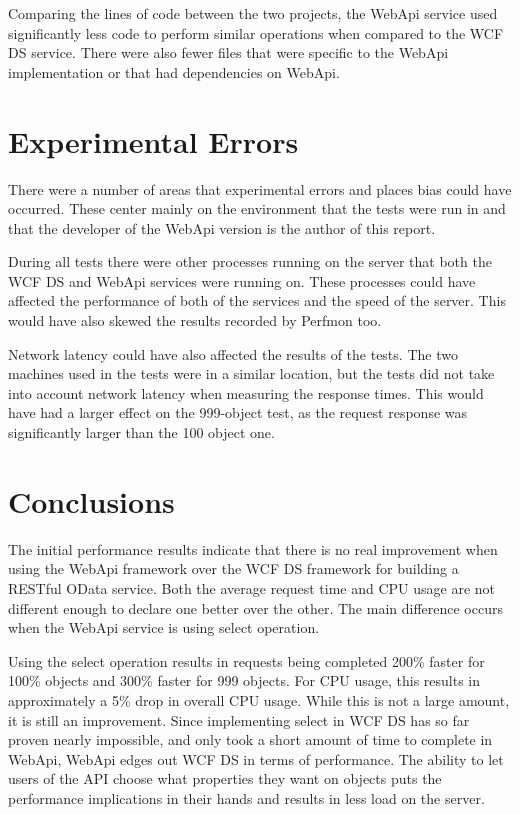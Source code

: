 \documentclass[se]{uw-wkrpt}
\begin{document}
Comparing the lines of code between the two projects, the WebApi service used significantly less code to perform similar operations when compared to the WCF DS service. There were also fewer files that were specific to the WebApi implementation or that had dependencies on WebApi.

\section{Experimental Errors}

There were a number of areas that experimental errors and places bias could have occurred. These center mainly on the environment that the tests were run in and that the developer of the WebApi version is the author of this report.

During all tests there were other processes running on the server that both the WCF DS and WebApi services were running on. These processes could have affected the performance of both of the services and the speed of the server. This would have also skewed the results recorded by Perfmon too.

Network latency could have also affected the results of the tests. The two machines used in the tests were in a similar location, but the tests did not take into account network latency when measuring the response times. This would have had a larger effect on the 999-object test, as the request response was significantly larger than the 100 object one.

\section{Conclusions}

The initial performance results indicate that there is no real improvement when using the WebApi framework over the WCF DS framework for building a RESTful OData service. Both the average request time and CPU usage are not different enough to declare one better over the other. The main difference occurs when the WebApi service is using select operation.

Using the select operation results in requests being completed 200\% faster for 100\% objects and 300\% faster for 999 objects. For CPU usage, this results in approximately a 5\% drop in overall CPU usage. While this is not a large amount, it is still an improvement. Since implementing select in WCF DS has so far proven nearly impossible, and only took a short amount of time to complete in WebApi, WebApi edges out WCF DS in terms of performance. The ability to let users of the API choose what properties they want on objects puts the performance implications in their hands and results in less load on the server.
\end{document}

